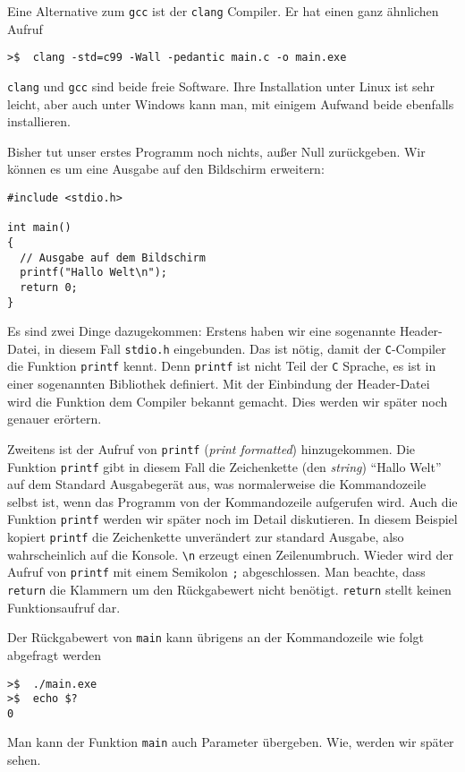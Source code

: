 Eine Alternative zum \texttt{gcc} ist der \texttt{clang} Compiler.
Er hat einen ganz ähnlichen Aufruf

\vspace*{0.5cm}
\begin{verbatim}
>$  clang -std=c99 -Wall -pedantic main.c -o main.exe
\end{verbatim}
\vspace*{0.5cm}

\noindent\texttt{clang} und \texttt{gcc} sind beide freie Software.
Ihre Installation unter Linux ist sehr leicht, aber auch unter Windows kann man, mit einigem Aufwand beide ebenfalls installieren.

Bisher tut unser erstes Programm noch nichts, außer Null zurückgeben. 
Wir können es um eine Ausgabe auf den Bildschirm erweitern:
\begin{lstlisting}[caption={Programm Hallo Welt}, belowcaptionskip=0.3em]
#include <stdio.h>

int main()
{
  // Ausgabe auf dem Bildschirm
  printf("Hallo Welt\n");
  return 0;
}
\end{lstlisting}
Es sind zwei Dinge dazugekommen:
Erstens haben wir eine sogenannte Header-Datei, in diesem Fall \texttt{stdio.h} eingebunden.
Das ist nötig, damit der \texttt{C}-Compiler die Funktion \texttt{printf} kennt.
Denn \texttt{printf} ist nicht Teil der \texttt{C} Sprache, es ist in einer sogenannten Bibliothek definiert. 
Mit der Einbindung der Header-Datei wird die Funktion dem Compiler bekannt gemacht.
Dies werden wir später noch genauer erörtern.

Zweitens ist der Aufruf von \texttt{printf} (\emph{print formatted}) hinzugekommen.
Die Funktion \texttt{printf} gibt in diesem Fall die Zeichenkette (den \emph{string}) \enquote{Hallo Welt} auf dem Standard Ausgabegerät aus, was normalerweise die Kommandozeile selbst ist, wenn das Programm von der Kommandozeile aufgerufen wird. 
Auch die Funktion \texttt{printf} werden wir später noch im Detail diskutieren.
In diesem Beispiel kopiert \texttt{printf} die Zeichenkette unverändert zur standard Ausgabe, also wahrscheinlich auf die Konsole.
\verb|\n| erzeugt einen Zeilenumbruch.
Wieder wird der Aufruf von \texttt{printf} mit einem Semikolon \texttt{;} abgeschlossen.
Man beachte, dass \texttt{return} die Klammern um den Rückgabewert nicht benötigt.
\texttt{return} stellt keinen Funktionsaufruf dar.


Der Rückgabewert von \texttt{main} kann übrigens an der Kommandozeile wie folgt abgefragt werden

\vspace*{0.5cm}
\begin{verbatim}
>$  ./main.exe
>$  echo $?
0
\end{verbatim}
\vspace*{0.5cm}

\noindent Man kann der Funktion \texttt{main} auch Parameter übergeben.
Wie, werden wir später sehen.

